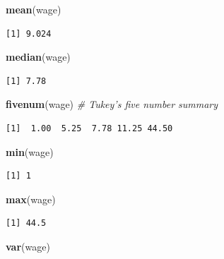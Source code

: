 \documentclass[
]{book}
\newenvironment{Shaded}{\begin{snugshade}}{\end{snugshade}}
\newcommand{\CommentTok}[1]{\textcolor[rgb]{0.56,0.35,0.01}{\textit{#1}}}
\newcommand{\KeywordTok}[1]{\textcolor[rgb]{0.13,0.29,0.53}{\textbf{#1}}}
\newcommand{\NormalTok}[1]{#1}
\begin{document}
\begin{Shaded}
\begin{Highlighting}[]
\KeywordTok{mean}\NormalTok{(wage)}
\end{Highlighting}
\end{Shaded}

\begin{verbatim}
[1] 9.024
\end{verbatim}

\begin{Shaded}
\begin{Highlighting}[]
\KeywordTok{median}\NormalTok{(wage)}
\end{Highlighting}
\end{Shaded}

\begin{verbatim}
[1] 7.78
\end{verbatim}

\begin{Shaded}
\begin{Highlighting}[]
\KeywordTok{fivenum}\NormalTok{(wage)	}\CommentTok{# Tukey's five number summary}
\end{Highlighting}
\end{Shaded}

\begin{verbatim}
[1]  1.00  5.25  7.78 11.25 44.50
\end{verbatim}

\begin{Shaded}
\begin{Highlighting}[]
\KeywordTok{min}\NormalTok{(wage)}
\end{Highlighting}
\end{Shaded}

\begin{verbatim}
[1] 1
\end{verbatim}

\begin{Shaded}
\begin{Highlighting}[]
\KeywordTok{max}\NormalTok{(wage)}
\end{Highlighting}
\end{Shaded}

\begin{verbatim}
[1] 44.5
\end{verbatim}

\begin{Shaded}
\begin{Highlighting}[]
\KeywordTok{var}\NormalTok{(wage)}
\end{Highlighting}
\end{Shaded}
\end{document}
